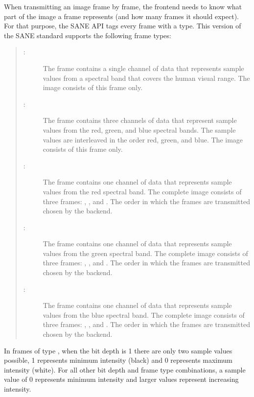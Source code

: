 \documentclass[11pt,DVIps]{report}
\begin{document}
When transmitting an image frame by frame, the frontend needs to know
what part of the image a frame represents (and how many frames it
should expect).  For that purpose, the SANE API tags every frame with
a type.  This version of the SANE standard supports the following
frame types:
\begin{quote}
\begin{description}

\item[:] The frame contains a single
  channel of data that represents sample values from a spectral band
  that covers the human visual range.  The image consists of this
  frame only.

\item[:] The frame contains three
  channels of data that represent sample values from the red, green,
  and blue spectral bands.  The sample values are interleaved in the
  order red, green, and blue.  The image consists of this frame only.

\item[:] The frame contains one channel
  of data that represents sample values from the red spectral band.
  The complete image consists of three frames:
  , , and
  .  The order in which the frames are
  transmitted chosen by the backend.

\item[:] The frame contains one
  channel of data that represents sample values from the green
  spectral band.  The complete image consists of three frames:
  , , and
  .  The order in which the frames are
  transmitted chosen by the backend.

\item[:] The frame contains one channel
  of data that represents sample values from the blue spectral band.
  The complete image consists of three frames:
  , , and
  .  The order in which the frames are
  transmitted chosen by the backend.

\end{description}
\end{quote}

In frames of type , when the bit depth is 1 there are
only two sample values possible, 1 represents minimum intensity
(black) and 0 represents maximum intensity (white).  For all other bit
depth and frame type combinations, a sample value of 0 represents
minimum intensity and larger values represent increasing intensity.
\end{document}
